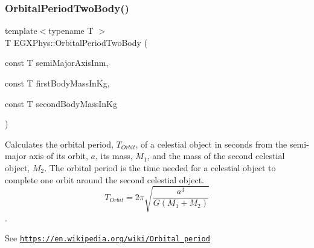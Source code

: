 \subsubsection{\texorpdfstring{Orbital\+Period\+Two\+Body()}{OrbitalPeriodTwoBody()}}
{\footnotesize\ttfamily template$<$typename T $>$ \\
T E\+G\+X\+Phys\+::\+Orbital\+Period\+Two\+Body (\begin{DoxyParamCaption}\item[{const T}]{semi\+Major\+Axis\+Inm,  }\item[{const T}]{first\+Body\+Mass\+In\+Kg,  }\item[{const T}]{second\+Body\+Mass\+In\+Kg }\end{DoxyParamCaption})}



Calculates the orbital period, $T_{Orbit}$, of a celestial object in seconds from the semi-\/major axis of its orbit, $a$, its mass, $M_1$, and the mass of the second celestial object, $M_2$. The orbital period is the time needed for a celestial object to complete one orbit around the second celestial object. \[ T_{Orbit}=2\pi\sqrt{\dfrac{a^3}{G(M_1 + M_2)}}\]. 

See \href{https://en.wikipedia.org/wiki/Orbital_period}{\tt https\+://en.\+wikipedia.\+org/wiki/\+Orbital\+\_\+period}


